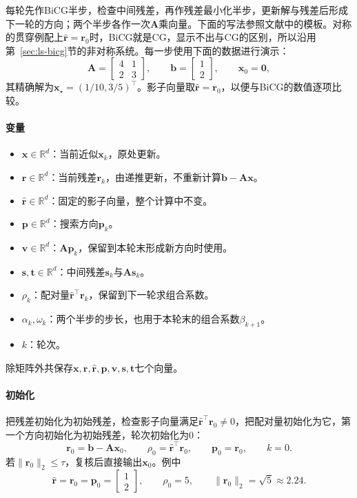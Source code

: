 每轮先作BiCG半步，检查中间残差，再作残差最小化半步，更新解与残差后形成下一轮的方向；两个半步各作一次$\bm A$乘向量。下面的写法参照文献中的模板。对称的贯穿例配上$\widehat{\bm r}=\bm r_0$时，BiCG就是CG，显示不出与CG的区别，所以沿用第~\ref{sec:ls-bicg}节的非对称系统。每一步使用下面的数据进行演示：
\[
 \bm A=\begin{bmatrix}4&1\\2&3\end{bmatrix},\qquad
 \bm b=\begin{bmatrix}1\\2\end{bmatrix},\qquad
 \bm x_0=\bm 0,
\]
其精确解为$\bm x_\star=(1/10,3/5)^\top$。影子向量取$\widehat{\bm r}=\bm r_0$，以便与BiCG的数值逐项比较。

\paragraph{变量}
\begin{itemize}
 \item $\bm x\in\mathbb R^d$：当前近似$\bm x_k$，原处更新。
 \item $\bm r\in\mathbb R^d$：当前残差$\bm r_k$，由递推更新，不重新计算$\bm b-\bm A\bm x$。
 \item $\widehat{\bm r}\in\mathbb R^d$：固定的影子向量，整个计算中不变。
 \item $\bm p\in\mathbb R^d$：搜索方向$\bm p_k$。
 \item $\bm v\in\mathbb R^d$：$\bm A\bm p_k$，保留到本轮末形成新方向时使用。
 \item $\bm s,\bm t\in\mathbb R^d$：中间残差$\bm s_k$与$\bm A\bm s_k$。
 \item $\rho_k$：配对量$\widehat{\bm r}^\top\bm r_k$，保留到下一轮求组合系数。
 \item $\alpha_k,\omega_k$：两个半步的步长，也用于本轮末的组合系数$\beta_{k+1}$。
 \item $k$：轮次。
\end{itemize}
除矩阵外共保存$\bm x,\bm r,\widehat{\bm r},\bm p,\bm v,\bm s,\bm t$七个向量。

\paragraph{初始化}
把残差初始化为初始残差，检查影子向量满足$\widehat{\bm r}^\top\bm r_0\ne0$，把配对量初始化为它，第一个方向初始化为初始残差，轮次初始化为$0$：
\[
 \bm r_0=\bm b-\bm A\bm x_0,\qquad \rho_0=\widehat{\bm r}^\top\bm r_0,\qquad \bm p_0=\bm r_0,\qquad k=0 .
\]
若$\lVert\bm r_0\rVert_2\le\tau$，复核后直接输出$\bm x_0$。例中
\[
 \widehat{\bm r}=\bm r_0=\bm p_0=\begin{bmatrix}1\\2\end{bmatrix},\qquad \rho_0=5,\qquad \lVert\bm r_0\rVert_2=\sqrt5\approx2.24 .
\]

